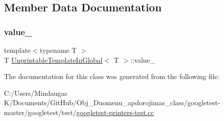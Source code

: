 \subsection{Member Data Documentation}
\mbox{\label{class_unprintable_template_in_global_a5eb13fa2dc8de0e4ac8848f87df19283}} 
\subsubsection{\texorpdfstring{value\_}{value\_}}
{\footnotesize\ttfamily template$<$typename T $>$ \\
T \mbox{\hyperlink{class_unprintable_template_in_global}{Unprintable\+Template\+In\+Global}}$<$ T $>$\+::value\+\_\+\hspace{0.3cm}{\ttfamily [private]}}



The documentation for this class was generated from the following file\+:\begin{DoxyCompactItemize}
\item 
C\+:/\+Users/\+Mindaugas K/\+Documents/\+Git\+Hub/\+Obj\+\_\+\+Duomenu\+\_\+apdorojimas\+\_\+class/googletest-\/master/googletest/test/\mbox{\hyperlink{googletest-master_2googletest_2test_2googletest-printers-test_8cc}{googletest-\/printers-\/test.\+cc}}\end{DoxyCompactItemize}
